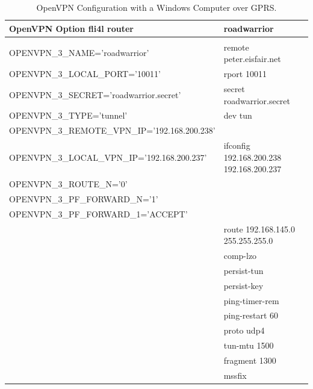 \begin{table}[htbp]
  \begin{scriptsize}
    \begin{tabular}{ll}
      OpenVPN Option fli4l router                   & roadwarrior           \\
      \hline \\
      OPENVPN\_3\_NAME='roadwarrior'                & remote peter.eisfair.net \\
      OPENVPN\_3\_LOCAL\_PORT='10011'               & rport 10011 \\
      OPENVPN\_3\_SECRET='roadwarrior.secret'       & secret roadwarrior.secret \\
      OPENVPN\_3\_TYPE='tunnel'                     & dev tun \\
      OPENVPN\_3\_REMOTE\_VPN\_IP='192.168.200.238' & ~ \\
      OPENVPN\_3\_LOCAL\_VPN\_IP='192.168.200.237'  & ifconfig 192.168.200.238 192.168.200.237 \\
      OPENVPN\_3\_ROUTE\_N='0'                      & ~ \\
      OPENVPN\_3\_PF\_FORWARD\_N='1'              & ~ \\
      OPENVPN\_3\_PF\_FORWARD\_1='ACCEPT' & ~ \\
      ~                                             & route 192.168.145.0 255.255.255.0 \\
      ~                                             & comp-lzo \\
      ~                                             & persist-tun \\
      ~                                             & persist-key \\
      ~                                             & ping-timer-rem \\
      ~                                             & ping-restart 60 \\
      ~                                             & proto udp4 \\
      ~                                             & tun-mtu 1500 \\
      ~                                             & fragment 1300 \\
      ~                                             & mssfix \\
    \end{tabular}
  \end{scriptsize}
  \caption{OpenVPN Configuration with a Windows Computer over GPRS.}
\end{table}

